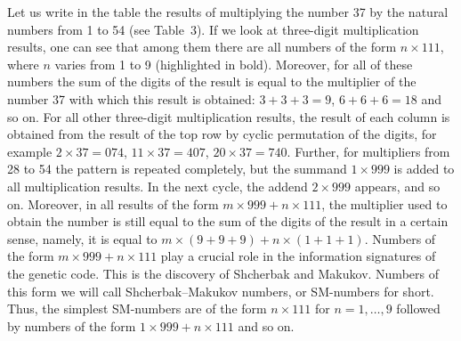 \documentclass[12pt]{article}
\begin{document}
Let us write in the table the results of multiplying the number 37 by the natural numbers from 1 to 54 (see Table~3). If we look at three-digit multiplication results, one can see that among them there are all numbers of the form $n \times 111$, where $n$ varies from 1 to 9 (highlighted in bold). Moreover, for all of these numbers the sum of the digits of the result is equal to the multiplier of the number 37 with which this result is obtained: $3 + 3 + 3 = 9$, $6 + 6 + 6 = 18$ and so on. For all other three-digit multiplication results, the result of each column is obtained from the result of the top row by cyclic permutation of the digits, for example $2 \times 37 = 074$, $11 \times 37 = 407$, $20 \times 37 = 740$. Further, for multipliers from 28 to 54 the pattern is repeated completely, but the summand $1 \times 999$ is added to all multiplication results. In the next cycle, the addend $2 \times 999$ appears, and so on. Moreover, in all results of the form $m \times 999 + n \times 111$, the multiplier used to obtain the number is still equal to the sum of the digits of the result in a certain sense, namely, it is equal to $m \times (9 + 9 + 9) + n \times (1 + 1 + 1)$. Numbers of the form $m \times 999 + n \times 111$ play a crucial role in the information signatures of the genetic code. This is the discovery of Shcherbak and Makukov. Numbers of this form we will call Shcherbak--Makukov numbers, or SM-numbers for short. Thus, the simplest SM-numbers are of the form $n \times 111$ for $n = 1, \ldots, 9$ followed by numbers of the form $1 \times 999 + n \times 111$ and so on.
\end{document}
